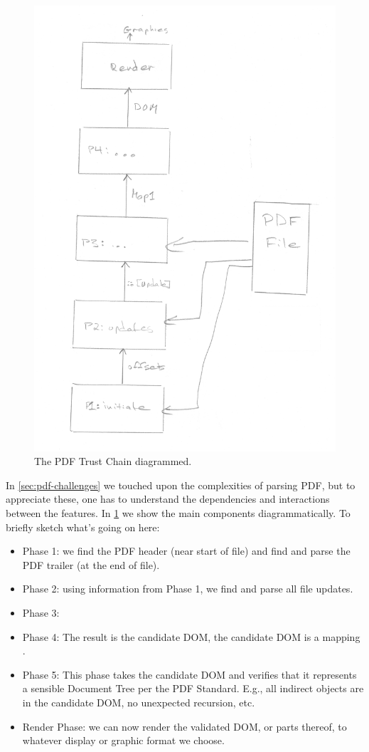 \begin{figure}[t]
    \centering
    \includegraphics[width=0.8\linewidth]{figures/trustchain-diagram.png}
    \caption{The PDF Trust Chain diagrammed.}
    \label{fig:pdf-trust-chain}
\end{figure}

In \cref{sec:pdf-challenges} we touched upon the complexities of parsing
PDF, but to appreciate these, one has to understand the
dependencies and interactions between the features.
In \cref{fig:pdf-trust-chain} we show the main components diagrammatically.
To briefly sketch what's going on here:
\begin{itemize}
\item Phase 1: we find the PDF header (near start of file) and find and parse
  the PDF trailer (at the end of file).
\item Phase 2: using information from Phase 1, we find and parse all file
  updates.
\item Phase 3: 
\item Phase 4:  The result is the candidate DOM, 
  the candidate DOM is a mapping .
\item Phase 5: This phase takes the candidate DOM and verifies that
  it represents a sensible Document Tree per the PDF Standard.  E.g.,
  all indirect objects are in the candidate DOM, no unexpected recursion,
  etc.
\item Render Phase: we can now render the validated DOM, or parts thereof, to
  whatever display or graphic format we choose.
\end{itemize}


